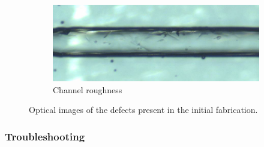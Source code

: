 \documentclass[final]{jyflluk}
\begin{document}
\begin{figure}[!h]
    \vspace{0.1cm}
    \begin{subfigure}{\textwidth}
    \centering
        \includegraphics[width=\linewidth]{optical/roughness2.png} 
        \caption{Channel roughness} \label{fig:roughness}
    \end{subfigure}
    \caption{Optical images of the defects present in the initial fabrication.} \label{fig:pinhole}
\end{figure}



\subsubsection{Troubleshooting}
\end{document}

